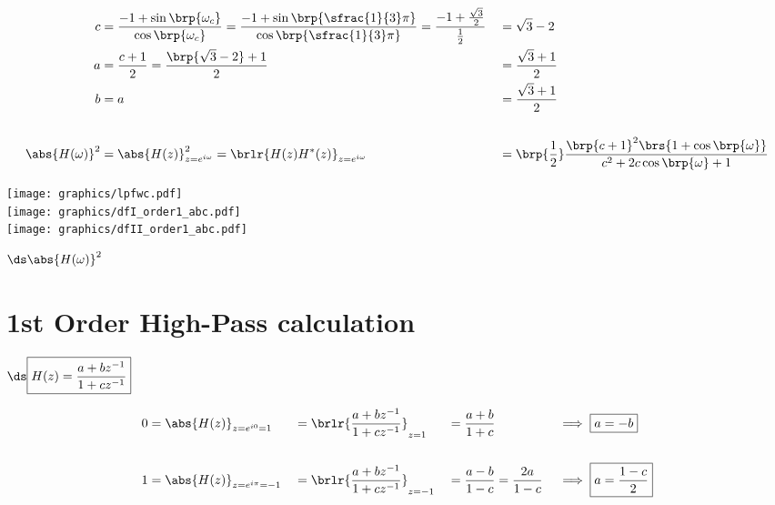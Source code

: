 { \begin{align*}
  c &= \frac{-1 + \sin\brp{\omega_c}}{\cos\brp{\omega_c}}
     = \frac{-1 + \sin\brp{\sfrac{1}{3}\pi}}{\cos\brp{\sfrac{1}{3}\pi}}
     = \frac{-1 + \frac{\sqrt{3}}{2}}{\frac{1}{2}}
   &&= \sqrt{3} - 2
  \\
  a &= \frac{c+1}{2}
     = \frac{\brp{\sqrt{3} - 2}+1}{2}
   &&= \frac{\sqrt{3}+1}{2}
  \\
  b &= a
   &&= \frac{\sqrt{3} + 1}{2}
  \\
  \\
  \abs{H(\omega)}^2
    &= \abs{H(z)}^2_{z=e^{i\omega}}
     = \brlr{H(z)H^\ast(z)}_{z=e^{i\omega}}
   &&= \brp{\frac{1}{2}}\frac{\brp{c+1}^2\brs{1 +  \cos\brp{\omega}}}
            {c^2 + 2 c\cos\brp{\omega} + 1}
\end{align*}}

\texttt{[image: graphics/lpfwc.pdf]}\\
\texttt{[image: graphics/dfI\_order1\_abc.pdf]}\\
\texttt{[image: graphics/dfII\_order1\_abc.pdf]}


$\ds\abs{H(\omega)}^2$



\section{1st Order High-Pass calculation}
$\ds\boxed{ H(z) = \frac{a + bz^{-1}}
                        {1 + cz^{-1}}
          }$

\begin{align*}
  0 &= {\abs{H(z)}}_{z=e^{i0}=1}    
    &&=\brlr{\frac{a + bz^{-1}}{1 + cz^{-1}}}_{z=1} 
    &&=\frac{a + b}{1 + c}                   
    && \implies \boxed{a=-b}
  \\\\
  1 &= \abs{H(z)}_{z=e^{i\pi}=-1} 
   &&= \brlr{\frac{a + bz^{-1}}{1 + cz^{-1}}}_{z=-1} 
   &&= \frac{a - b}{1 - c} = \frac{2a}{1-c}                   
   &&  \implies \boxed{a=\frac{1-c}{2}}
\end{align*}


